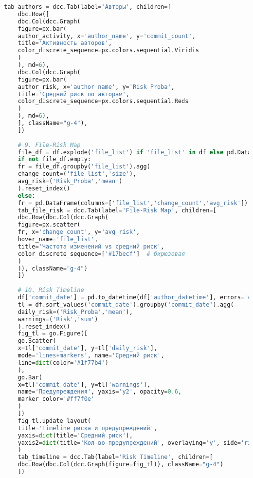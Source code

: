 \begin{lstlisting}[language=Python, caption={{ \texttt{app.py}}}]
	tab_authors = dcc.Tab(label='Авторы', children=[
	dbc.Row([
	dbc.Col(dcc.Graph(
	figure=px.bar(
	author_activity, x='author_name', y='commit_count',
	title='Активность авторов',
	color_discrete_sequence=px.colors.sequential.Viridis
	)
	), md=6),
	dbc.Col(dcc.Graph(
	figure=px.bar(
	author_risk, x='author_name', y='Risk_Proba',
	title='Средний риск по авторам',
	color_discrete_sequence=px.colors.sequential.Reds
	)
	), md=6),
	], className="g-4"),
	])
	
	# 9. File-Risk Map
	file_df = df.explode('file_list') if 'file_list' in df else pd.DataFrame()
	if not file_df.empty:
	fr = file_df.groupby('file_list').agg(
	change_count=('file_list','size'),
	avg_risk=('Risk_Proba','mean')
	).reset_index()
	else:
	fr = pd.DataFrame(columns=['file_list','change_count','avg_risk'])
	tab_file_risk = dcc.Tab(label='File-Risk Map', children=[
	dbc.Row(dbc.Col(dcc.Graph(
	figure=px.scatter(
	fr, x='change_count', y='avg_risk',
	hover_name='file_list',
	title='Частота изменений vs средний риск',
	color_discrete_sequence=['#17becf']  # бирюзовая
	)
	)), className="g-4")
	])
	
	# 10. Risk Timeline
	df['commit_date'] = pd.to_datetime(df['author_datetime'], errors='coerce').dt.date
	tl = df.sort_values('commit_date').groupby('commit_date').agg(
	daily_risk=('Risk_Proba','mean'),
	warnings=('Risk','sum')
	).reset_index()
	fig_tl = go.Figure([
	go.Scatter(
	x=tl['commit_date'], y=tl['daily_risk'],
	mode='lines+markers', name='Средний риск',
	line=dict(color='#1f77b4')
	),
	go.Bar(
	x=tl['commit_date'], y=tl['warnings'],
	name='Предупреждения', yaxis='y2', opacity=0.6,
	marker_color='#ff7f0e'
	)
	])
	fig_tl.update_layout(
	title='Timeline риска и предупреждений',
	yaxis=dict(title='Средний риск'),
	yaxis2=dict(title='Кол-во предупреждений', overlaying='y', side='right')
	)
	tab_timeline = dcc.Tab(label='Risk Timeline', children=[
	dbc.Row(dbc.Col(dcc.Graph(figure=fig_tl)), className="g-4")
	])
	

\end{lstlisting}

